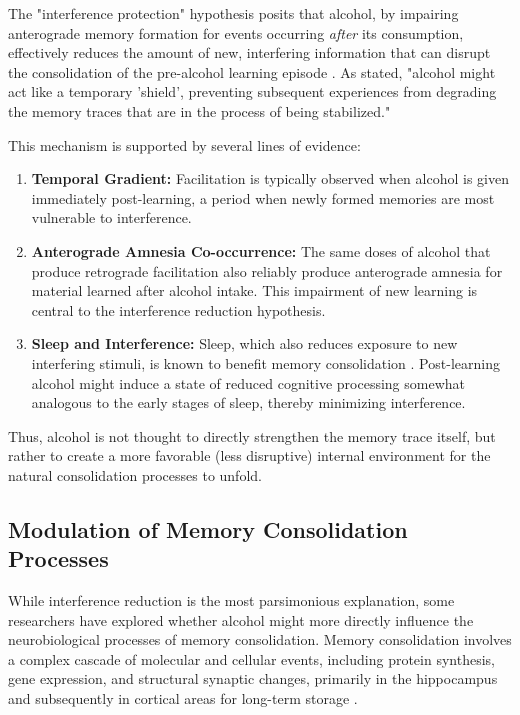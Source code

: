 \documentclass[12pt, a4paper]{article}
\begin{document}
The "interference protection" hypothesis posits that alcohol, by impairing anterograde memory formation for events occurring \textit{after} its consumption, effectively reduces the amount of new, interfering information that can disrupt the consolidation of the pre-alcohol learning episode \cite{Parker1981}. As \cite{Hewitt1995} stated, "alcohol might act like a temporary 'shield', preventing subsequent experiences from degrading the memory traces that are in the process of being stabilized."

This mechanism is supported by several lines of evidence:
\begin{enumerate}
    \item \textbf{Temporal Gradient:} Facilitation is typically observed when alcohol is given immediately post-learning, a period when newly formed memories are most vulnerable to interference.
    \item \textbf{Anterograde Amnesia Co-occurrence:} The same doses of alcohol that produce retrograde facilitation also reliably produce anterograde amnesia for material learned after alcohol intake. This impairment of new learning is central to the interference reduction hypothesis.
    \item \textbf{Sleep and Interference:} Sleep, which also reduces exposure to new interfering stimuli, is known to benefit memory consolidation \cite{Stickgold2005}. Post-learning alcohol might induce a state of reduced cognitive processing somewhat analogous to the early stages of sleep, thereby minimizing interference.
\end{enumerate}
Thus, alcohol is not thought to directly strengthen the memory trace itself, but rather to create a more favorable (less disruptive) internal environment for the natural consolidation processes to unfold.

\subsection{Modulation of Memory Consolidation Processes}
While interference reduction is the most parsimonious explanation, some researchers have explored whether alcohol might more directly influence the neurobiological processes of memory consolidation. Memory consolidation involves a complex cascade of molecular and cellular events, including protein synthesis, gene expression, and structural synaptic changes, primarily in the hippocampus and subsequently in cortical areas for long-term storage \cite{McGaugh2000}.
\end{document}

